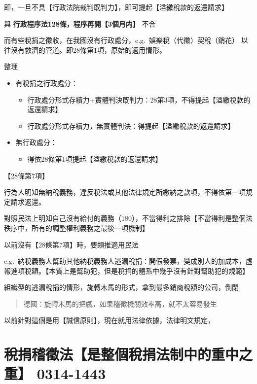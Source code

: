 \documentclass[]{ctexbook}
\providecommand{\tightlist}{%
  \setlength{\itemsep}{0pt}\setlength{\parskip}{0pt}}
\begin{document}
即，一旦不具【行政法院裁判既判力】，即可提起【溢繳稅款的返還請求】

與 \textbf{行政程序法128條，程序再開【3個月内】} 不合

而有些稅捐之徵收，在我國沒有行政處分，e.g.~娛樂稅（代徵）契稅（銷花）
以往沒有救濟的管道。即28條第1項，原始的適用情形。

整理

\begin{itemize}
\tightlist
\item
  有稅捐之行政處分：

  \begin{itemize}
  \tightlist
  \item
    行政處分形式存續力+實體判決既判力：28第3項，不得提起【溢繳稅款的返還請求】
  \item
    行政處分形式存續力，無實體判決：得提起【溢繳稅款的返還請求】
  \end{itemize}
\item
  無行政處分：

  \begin{itemize}
  \tightlist
  \item
    得依28條第1項提起【溢繳稅款的返還請求】
  \end{itemize}
\end{itemize}

【28條第7項】

行為人明知無納稅義務，違反稅法或其他法律規定所繳納之款項，不得依第一項規定請求返還。

對照民法上明知自己沒有給付的義務（180），不當得利之排除【不當得利是整個法秩序中，所有的調整權利義務之最後一項機制】

以前沒有【28條第7項】時，要類推適用民法

e.g.~納稅義務人幫助其他納稅義務人逃漏稅捐：開假發票，變成別人的加成本，虛報進項稅額。【本質上是幫助犯，但是稅捐的體系中幾乎沒有針對幫助犯的規範】

組織型的逃漏稅捐的情形，旋轉木馬的形式，拿到最多銷商稅額的公司，倒閉

\begin{quote}
德國：旋轉木馬的把戲，如果稽徵機關效率高，就不太容易發生
\end{quote}

以前針對這個是用【誠信原則】，現在就用法律依據，法律明文規定，

\hypertarget{ux7a05ux6350ux7a3dux5fb5ux6cd5ux662fux6574ux500bux7a05ux6350ux6cd5ux5236ux4e2dux7684ux91cdux4e2dux4e4bux91cd-0314-1443}{%
\chapter{稅捐稽徵法【是整個稅捐法制中的重中之重】 0314-1443}\label{ux7a05ux6350ux7a3dux5fb5ux6cd5ux662fux6574ux500bux7a05ux6350ux6cd5ux5236ux4e2dux7684ux91cdux4e2dux4e4bux91cd-0314-1443}}
\end{document}
